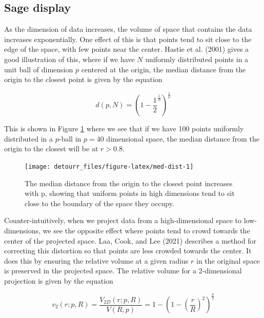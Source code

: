 \hypertarget{sage-display}{%
\subsection{Sage display}\label{sage-display}}

As the dimension of data increases, the volume of space that contains the data increases exponentially. One effect of this is that points tend to sit close to the edge of the space, with few points near the center. Hastie et al. (2001) gives a good illustration of this, where if we have \(N\) uniformly distributed points in a unit ball of dimension \(p\) centered at the origin, the median distance from the origin to the closest point is given by the equation

\begin{equation}
d(p, N) = \left( 1- \frac{1}{2}^\frac{1}{N}\right)^\frac{1}{p}
\end{equation}

This is shown in Figure \ref{fig:med-dist} where we see that if we have 100 points uniformly distributed in a \(p\)-ball in \(p=40\) dimensional space, the median distance from the origin to the closest will be at \(r > 0.8\).

\begin{figure}

{\centering \texttt{[image: detourr\_files/figure-latex/med-dist-1]} 

}

\caption{The median distance from the origin to the closest point increases with p, showing that uniform points in high dimensions tend to sit close to the boundary of the space they occupy.}\label{fig:med-dist}
\end{figure}

Counter-intuitively, when we project data from a high-dimensional space to low-dimensions, we see the opposite effect where points tend to crowd towards the center of the projected space. Laa, Cook, and Lee (2021) describes a method for correcting this distortion so that points are less crowded towards the center. It does this by ensuring the relative volume at a given radius \(r\) in the original space is preserved in the projected space. The relative volume for a 2-dimensional projection is given by the equation

\begin{equation}
v_2(r; p, R) 
= \frac{V_{2D}(r; p, R)}{V(R,p)}
= 1 - \left(1-\left(\frac{r}{R}\right)^2\right)^\frac{p}{2}
\label{eq:radialcdf2d}
\end{equation}

